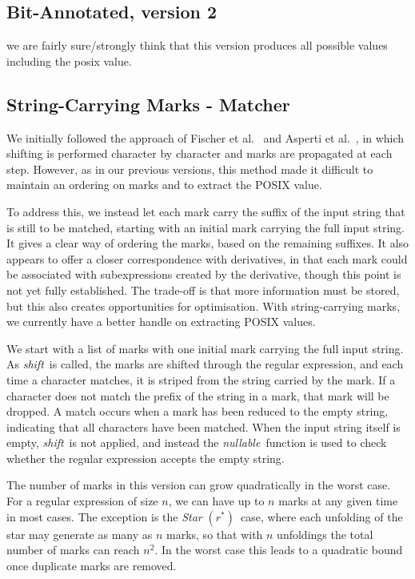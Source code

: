 \documentclass[12pt]{article}
\newcommand{\shift}{\textit{shift}}
\newcommand{\nullable}{\textit{nullable}}
\newcommand{\STARText}{\textit{Star} $(r^*)$}
\begin{document}
\newpage


\subsection{Bit-Annotated, version 2}
we are fairly sure/strongly think that this version produces all possible values including the posix value.

\subsection{String-Carrying Marks - Matcher}
We initially followed the approach of Fischer et al.~\cite{Fischer2010} and Asperti et al.~\cite{Asperti2010}, in which shifting is performed character by 
character and marks are propagated at each step. However, as in our previous versions, this method made it difficult to maintain an ordering on marks and to 
extract the POSIX value.  

To address this, we instead let each mark carry the suffix of the input string that is still to be matched, starting with an initial mark carrying the full 
input string. It gives a clear way of ordering the marks,  
based on the remaining suffixes.  
It also appears to offer a closer correspondence with derivatives,  
in that each mark could be associated with subexpressions created by the derivative,  
though this point is not yet fully established. 
The trade-off is that more information must be 
stored, but this also creates opportunities for optimisation. With string-carrying marks, we currently have a better handle on extracting POSIX values.

We start with a list of marks with one initial mark carrying the full input string.
As \shift\ is called, the marks are shifted through the regular expression,
and each time a character matches, it is striped from the string carried by the mark.
If a character does not match the prefix of the string in a mark, that mark will be dropped.
A match occurs when a mark has been reduced to the empty string,
indicating that all characters have been matched.
When the input string itself is empty, \shift\ is not applied,
and instead the \nullable\ function is used to check whether the 
regular expression accepts the empty string.

The number of marks in this version can grow quadratically in the worst case. 
For a regular expression of size $n$, we can have up to $n$ marks at any given time in most cases. 
The exception is the \STARText\ case, where each unfolding of the star may generate as many as $n$ marks, 
so that with $n$ unfoldings the total number of marks can reach $n^2$. 
In the worst case this leads to a quadratic bound once duplicate marks are removed.
\end{document}
